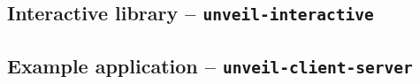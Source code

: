 \subsection{Interactive library -- \texttt{unveil-interactive}}
\label{sec:implementation-architecture-interactive}

\subsection{Example application -- \texttt{unveil-client-server}}
\label{sec:implementation-architecture-client-server}
